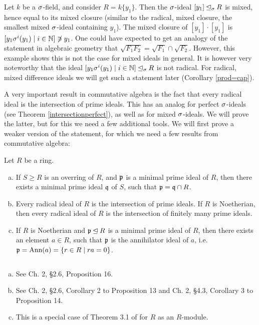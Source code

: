 \begin{ex} %
Let $k$ be a $\sigma$-field, and consider $R = k\{y_1\}$. Then the $\sigma$-ideal $[y_1] \unlhd_{\sigma} R$ is mixed, hence equal to its mixed closure (similar to the radical, mixed closure, the smallest mixed $\sigma$-ideal containing $y_1$).
The mixed closure of $[y_1] \cdot [y_1]$ is $[ y_1 \sigma^i(y_1) \mid i \in \mathbb{N} ] \not \ni y_1$.
One could have expected to get an analogy of the statement in algebraic geometry that $\sqrt{F_1  F_2 } = \sqrt{F_1} \cap \sqrt{F_2}$. However, this example shows this is not the case for mixed ideals in general.
It is however very noteworthy that the ideal $[ y_1 \sigma^i(y_1) \mid i \in \mathbb{N} ] \unlhd_{\sigma} R$ is not radical. For radical, mixed difference ideals we will get such a statement later (Corollary \ref{prod=cap}).
\end{ex}

A very important result in commutative algebra is the fact that every radical ideal is the intersection of prime ideals. This has an analog for perfect $\sigma$-ideals (see Theorem \ref{intersectionperfect}), as well as for mixed $\sigma$-ideals. 
We will prove the latter, but for this we need a few additional tools. We will first prove a weaker version of the statement, for which we need a few results from commutative algebra:

\begin{lem}\label{commalg}
Let $R$ be a ring. 
\begin{enumerate}[(a)]
\item If $S \geq R$ is an overring of $R$, and $\mathfrak{p}$ is a minimal prime ideal of $R$, then there exists a minimal prime ideal $\mathfrak{q}$ of $S$, such that $\mathfrak{p} = \mathfrak{q} \cap R$.
\item Every radical ideal of $R$ is the intersection of prime ideals. If $R$ is Noetherian, then every radical ideal of $R$ is the intersection of finitely many prime ideals.
\item If $R$ is Noetherian and $\mathfrak{p} \unlhd R$ is a minimal prime ideal of $R$, then there exists an element $a \in R$, such that $\mathfrak{p}$ is the annihilator ideal of $a$, i.e. $\mathfrak{p} = \text{Ann}(a) = \{ r \in R \mid ra = 0 \}$.
\end{enumerate}
\begin{bew} $~$
\begin{enumerate}[(a)]
\item See \cite{bourbaki} Ch. 2, \S 2.6, Proposition 16.
\item See \cite{bourbaki} Ch. 2, \S 2.6, Corollary 2 to Proposition 13 and Ch. 2, \S 4.3, Corollary 3 to Proposition 14.
\item This is a special case of Theorem 3.1 of \cite{eisenbud} for $R$ as an $R$-module.
\end{enumerate}
\end{bew}
\end{lem}


